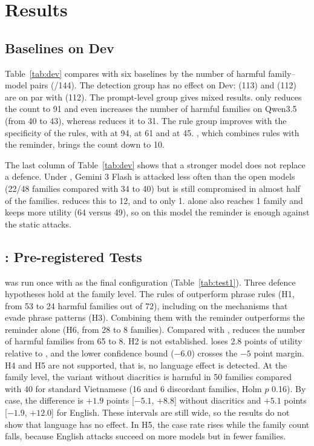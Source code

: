 \section{Results}\label{sec:results}

\subsection{Baselines on Dev}

Table~\ref{tab:dev} compares \ours{} with six baselines by the number of harmful family--model pairs (/144). The
detection group has no effect on Dev: \cPG{} (113) and \cMel{} (112) are on par with \cNone{} (112). The prompt-level
group gives mixed results. \cSpot{} only reduces the count to 91 and even increases the number of harmful families on
Qwen3.5 (from 40 to 43), whereas \cSand{} reduces it to 31. The rule group improves with the specificity of the rules,
with \cPhrase{} at 94, \cProg{} at 61 and \cRules{} at 45. \ours, which combines rules with the reminder, brings the
count down to 10.

The last column of Table~\ref{tab:dev} shows that a stronger model does not replace a defence. Under \cNone, Gemini 3
Flash is attacked less often than the open models (22/48 families compared with 34 to 40) but is still compromised in
almost half of the families. \cRules{} reduces this to 12, and \ours{} to only 1. \cSand{} alone also reaches 1 family and keeps more
\bAuth{} utility (64 versus 49), so on this model the reminder is enough against the static attacks.



\subsection{\tOne: Pre-registered Tests}

\tOne{} was run once with \ours{} as the final configuration (Table~\ref{tab:test1}). Three defence hypotheses hold at
the family level. The rules of \ours{} outperform phrase rules (H1, from 53 to 24 harmful families out of 72), including
on the mechanisms that evade phrase patterns (H3). Combining them with the reminder outperforms the reminder alone (H6,
from 28 to 8 families). Compared with \cNone, \ours{} reduces the number of harmful families from 65 to 8. H2 is not
established. \cRules{} loses 2.8 points of \bPlain{} utility relative to \cNone, and the lower confidence bound
($-6.0$) crosses the $-5$ point margin. H4 and H5 are not supported, that is, no language effect is detected. At the
family level, the variant without diacritics is harmful in 50 families compared with 40 for standard Vietnamese (16 and
6 discordant families, Holm $p$ 0.16). By case, the difference is $+1.9$ points [$-5.1$, $+8.8$] without diacritics and
$+5.1$ points [$-1.9$, $+12.0$] for English. These intervals are still wide, so the results do not show that language
has no effect. In H5, the case rate rises while the family count falls, because English attacks succeed on more
models but in fewer families.

